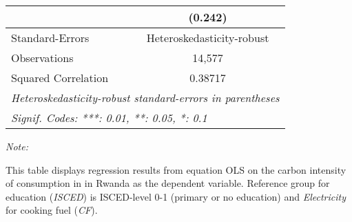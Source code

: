 \begin{table}[htbp!]
\begin{adjustbox}{width = 1\textwidth, max height = 0.95\textheight, center}
\begin{threeparttable}[b]
\begin{tabular}{lc}
                                & (0.242)\\   
            \midrule 
            Standard-Errors     & Heteroskedasticity-robust \\   
            Observations        & 14,577\\  
            Squared Correlation & 0.38717\\  
            \midrule \midrule
            \multicolumn{2}{l}{\emph{Heteroskedasticity-robust standard-errors in parentheses}}\\
            \multicolumn{2}{l}{\emph{Signif. Codes: ***: 0.01, **: 0.05, *: 0.1}}\\
         \end{tabular}
         
         \begin{tablenotes}\item \medskip \textit{Note:}
            \item This table displays regression results from equation OLS on the carbon intensity of consumption in  in Rwanda as the dependent variable. Reference group for education (\textit{ISCED}) is ISCED-level 0-1 (primary or no education) and \textit{Electricity} for cooking fuel (\textit{CF}).
         \end{tablenotes}
      \end{threeparttable}
   \end{adjustbox}
\end{table}


